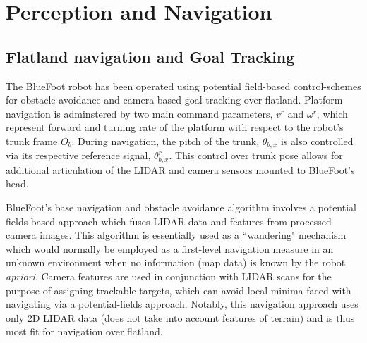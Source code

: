 \chapter{Perception and Navigation}
\label{ch::navigation}


	\section{Flatland navigation and Goal Tracking}
	
		The BlueFoot robot has been operated using potential field-based control-schemes for obstacle avoidance and camera-based goal-tracking over flatland. Platform navigation is adminstered by two main command parameters, $v^{r}$ and $\omega^{r}$, which represent forward and turning rate of the platform with respect to the robot's trunk frame $O_{b}$. During navigation, the pitch of the trunk, $\theta_{b,x}$ is also controlled via its respective reference signal, $\theta_{b,x}^{r}$. This control over trunk pose allows for additional articulation of the LIDAR and camera sensors mounted to BlueFoot's head. 

		BlueFoot's base navigation and obstacle avoidance algorithm involves a potential fields-based approach which fuses LIDAR data and features from processed camera images. This algorithm is essentially used as a ``wandering" mechanism which would normally be employed as a first-level navigation measure in an unknown environment when no information (\EG map data) is known by the robot \emph{apriori}. Camera features are used in conjunction with LIDAR scans for the purpose of assigning trackable targets, which can avoid local minima faced with navigating via a potential-fields approach. Notably, this navigation approach uses only 2D LIDAR data (does not take into account features of terrain) and is thus most fit for navigation over flatland.

